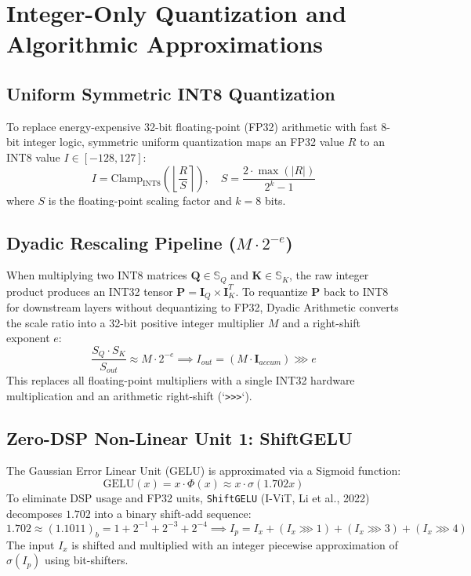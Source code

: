 \documentclass[11pt,a4paper]{article}
\begin{document}
\section{Integer-Only Quantization and Algorithmic Approximations}

\subsection{Uniform Symmetric INT8 Quantization}
To replace energy-expensive 32-bit floating-point (FP32) arithmetic with fast 8-bit integer logic, symmetric uniform quantization maps an FP32 value $R$ to an INT8 value $I \in [-128, 127]$:
\begin{equation}
I = \text{Clamp}_{\text{INT8}} \left( \left\lfloor \frac{R}{S} \right\rceil \right), \quad S = \frac{2 \cdot \max(|R|)}{2^k - 1}
\end{equation}
where $S$ is the floating-point scaling factor and $k=8$ bits.

\subsection{Dyadic Rescaling Pipeline ($M \cdot 2^{-e}$)}
When multiplying two INT8 matrices $\mathbf{Q} \in \mathbb{S}_Q$ and $\mathbf{K} \in \mathbb{S}_K$, the raw integer product produces an INT32 tensor $\mathbf{P} = \mathbf{I}_Q \times \mathbf{I}_K^T$. To requantize $\mathbf{P}$ back to INT8 for downstream layers without dequantizing to FP32, Dyadic Arithmetic converts the scale ratio into a 32-bit positive integer multiplier $M$ and a right-shift exponent $e$:
\begin{equation}
\frac{S_Q \cdot S_K}{S_{out}} \approx M \cdot 2^{-e} \implies I_{out} = \left( M \cdot \mathbf{I}_{accum} \right) \ggg e
\end{equation}
This replaces all floating-point multipliers with a single INT32 hardware multiplication and an arithmetic right-shift (`\texttt{>>>}`).

\subsection{Zero-DSP Non-Linear Unit 1: ShiftGELU}
The Gaussian Error Linear Unit (GELU) is approximated via a Sigmoid function:
\begin{equation}
\text{GELU}(x) = x \cdot \Phi(x) \approx x \cdot \sigma(1.702 x)
\end{equation}
To eliminate DSP usage and FP32 units, \texttt{ShiftGELU} (I-ViT, Li et al., 2022) decomposes $1.702$ into a binary shift-add sequence:
\begin{equation}
1.702 \approx (1.1011)_b = 1 + 2^{-1} + 2^{-3} + 2^{-4} \implies I_p = I_x + (I_x \ggg 1) + (I_x \ggg 3) + (I_x \ggg 4)
\end{equation}
The input $I_x$ is shifted and multiplied with an integer piecewise approximation of $\sigma(I_p)$ using bit-shifters.
\end{document}
